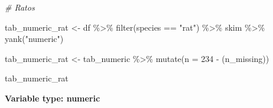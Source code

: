 \documentclass[
]{article}
\newenvironment{Shaded}{\begin{snugshade}}{\end{snugshade}}
\newcommand{\AttributeTok}[1]{\textcolor[rgb]{0.77,0.63,0.00}{#1}}
\newcommand{\CommentTok}[1]{\textcolor[rgb]{0.56,0.35,0.01}{\textit{#1}}}
\newcommand{\DecValTok}[1]{\textcolor[rgb]{0.00,0.00,0.81}{#1}}
\newcommand{\FunctionTok}[1]{\textcolor[rgb]{0.00,0.00,0.00}{#1}}
\newcommand{\NormalTok}[1]{#1}
\newcommand{\OtherTok}[1]{\textcolor[rgb]{0.56,0.35,0.01}{#1}}
\newcommand{\SpecialCharTok}[1]{\textcolor[rgb]{0.00,0.00,0.00}{#1}}
\newcommand{\StringTok}[1]{\textcolor[rgb]{0.31,0.60,0.02}{#1}}
\begin{document}
\begin{Shaded}
\begin{Highlighting}[]
\CommentTok{\# Ratos}


\NormalTok{tab\_numeric\_rat }\OtherTok{\textless{}{-}}\NormalTok{ df }\SpecialCharTok{\%\textgreater{}\%} 
  \FunctionTok{filter}\NormalTok{(species }\SpecialCharTok{==} \StringTok{"rat"}\NormalTok{) }\SpecialCharTok{\%\textgreater{}\%} 
\NormalTok{  skim }\SpecialCharTok{\%\textgreater{}\%}
  \FunctionTok{yank}\NormalTok{(}\StringTok{"numeric"}\NormalTok{)}

\NormalTok{tab\_numeric\_rat }\OtherTok{\textless{}{-}}\NormalTok{ tab\_numeric }\SpecialCharTok{\%\textgreater{}\%} 
  \FunctionTok{mutate}\NormalTok{(}\AttributeTok{n =} \DecValTok{234} \SpecialCharTok{{-}}\NormalTok{ (n\_missing))}

\NormalTok{tab\_numeric\_rat}
\end{Highlighting}
\end{Shaded}

\textbf{Variable type: numeric}
\end{document}

